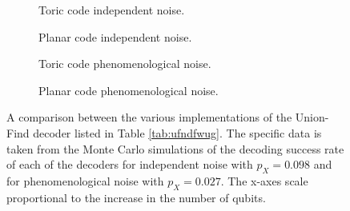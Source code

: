 \begin{figure}[htbp]
  \centering
  \begin{subfigure}[b]{0.49\textwidth}
      \begin{adjustbox}{Clip=0 1em 0 0}
        
      \end{adjustbox}
      \caption{Toric code independent noise.}
  \end{subfigure}
  \begin{subfigure}[b]{0.49\textwidth}
      \begin{adjustbox}{Clip=0 1em 0 0}
        
      \end{adjustbox}
      \caption{Planar code independent noise.}
  \end{subfigure}
  \begin{subfigure}[b]{0.49\textwidth}
      \begin{adjustbox}{Clip=0 1em 0 0}
        
      \end{adjustbox}
      \caption{Toric code phenomenological noise.}
  \end{subfigure}
  \begin{subfigure}[b]{0.49\textwidth}
      \begin{adjustbox}{Clip=0 1em 0 0}
        
      \end{adjustbox}
      \caption{Planar code phenomenological noise.}
  \end{subfigure}
  \caption{A comparison between the various implementations of the Union-Find decoder listed in Table \ref{tab:ufndfwug}. The specific data is taken from the Monte Carlo simulations of the decoding success rate of each of the decoders for independent noise with $p_X = 0.098$ and for phenomenological noise with $p_X = 0.027$. The x-axes scale proportional to the increase in the number of qubits.}\label{fig:mwcomp_uf}
\end{figure}

